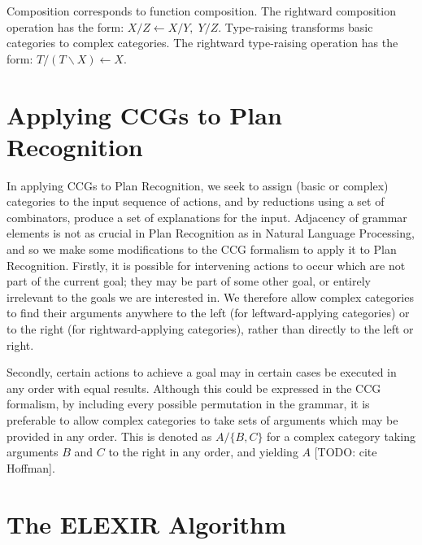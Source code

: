 Composition corresponds to function composition. The rightward composition operation has the form: $X/Z \leftarrow X/Y,\;  Y/Z$. Type-raising transforms basic categories to complex categories. The rightward type-raising operation has the form: $T/(T\backslash X) \leftarrow X$.

\section{Applying CCGs to Plan Recognition}

In applying CCGs to Plan Recognition, we seek to assign (basic or complex) categories to the input sequence of actions, and by reductions using a set of combinators, produce a set of explanations for the input. Adjacency of grammar elements is not as crucial in Plan Recognition as in Natural Language Processing, and so we make some modifications to the CCG formalism to apply it to Plan Recognition.
Firstly, it is possible for intervening actions to occur which are not part of the current goal; they may be part of some other goal, or entirely irrelevant to the goals we are interested in. We therefore allow complex categories to find their arguments anywhere to the left (for leftward-applying categories) or to the right (for rightward-applying categories), rather than directly to the left or right.

Secondly, certain actions to achieve a goal may in certain cases be executed in any order with equal results. Although this could be expressed in the CCG formalism, by including every possible permutation in the grammar, it is preferable to allow complex categories to take sets of arguments which may be provided in any order. This is denoted as $A/\{B, C\}$ for a complex category taking arguments $B$ and $C$ to the right in any order, and yielding $A$ [TODO: cite Hoffman].

\section{The ELEXIR Algorithm}

